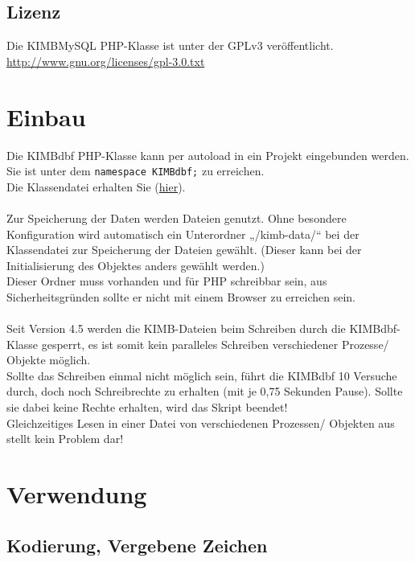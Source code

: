 \documentclass[paper=A4,pagesize=auto,12pt,headinclude=true,footinclude=true,BCOR=0mm,DIV=calc]{scrartcl}
\begin{document}
  
  \subsection{Lizenz}
  Die KIMBMySQL PHP-Klasse ist unter der GPLv3 veröffentlicht.\\
  \href{http://www.gnu.org/licenses/gpl-3.0.txt}{http://www.gnu.org/licenses/gpl-3.0.txt}

  \section{Einbau}
  
  Die KIMBdbf PHP-Klasse kann per autoload in ein Projekt eingebunden werden. Sie ist unter dem \lstinline-namespace KIMBdbf;- zu erreichen.\\
  Die Klassendatei erhalten Sie (\href{https://github.com/kimbtech/KIMBdbf}{hier}).\\
  \\
  Zur Speicherung der Daten werden Dateien genutzt. Ohne besondere Konfiguration wird automatisch
  ein Unterordner „/kimb-data/“ bei der Klassendatei zur Speicherung der Dateien gewählt.
  (Dieser kann bei der Initialisierung des Objektes anders gewählt werden.)\\
  Dieser Ordner muss vorhanden und für PHP schreibbar sein, aus Sicherheitsgründen sollte er nicht mit einem Browser zu erreichen sein.\\
  \\
  Seit Version 4.5 werden die KIMB-Dateien beim Schreiben durch die KIMBdbf-Klasse gesperrt, es ist somit
  kein paralleles Schreiben verschiedener Prozesse/ Objekte möglich.\\
  Sollte das Schreiben einmal nicht möglich sein, führt die KIMBdbf 10 Versuche durch,
  doch noch Schreibrechte zu erhalten (mit je 0,75 Sekunden Pause). Sollte sie dabei keine Rechte
  erhalten, wird das Skript beendet!\\
  Gleichzeitiges Lesen in einer Datei von verschiedenen Prozessen/ Objekten aus stellt kein Problem dar!\\
    
  \newpage
  \section{Verwendung}
  
  \subsection{Kodierung, Vergebene Zeichen}
  
\end{document}
